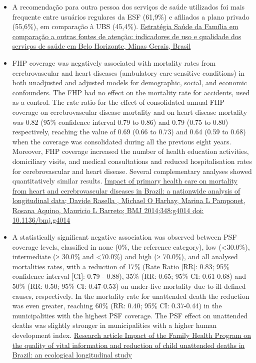 \documentclass[]{book}
\begin{document}
\begin{itemize}
\item
  A recomendação para outra pessoa dos serviços de saúde utilizados foi mais frequente entre usuários regulares da ESF (61,9\%) e afiliados a plano privado (55,6\%), em comparação à UBS (45,4\%). \href{http://www.scielo.br/scielo.php?script=sci_arttext\&pid=S0102-311X2013000700011\&lng=en\&nrm=iso\&tlng=en}{Estratégia Saúde da Família em comparação a outras fontes de atenção: indicadores de uso e qualidade dos serviços de saúde em Belo Horizonte, Minas Gerais, Brasil}
\item
  FHP coverage was negatively associated with mortality rates from cerebrovascular and heart diseases (ambulatory care-sensitive conditions) in both unadjusted and adjusted models for demographic, social, and economic confounders. The FHP had no effect on the mortality rate for accidents, used as a control. The rate ratio for the effect of consolidated annual FHP coverage on cerebrovascular disease mortality and on heart disease mortality was 0.82 (95\% confidence interval 0.79 to 0.86) and 0.79 (0.75 to 0.80) respectively, reaching the value of 0.69 (0.66 to 0.73) and 0.64 (0.59 to 0.68) when the coverage was consolidated during all the previous eight years. Moreover, FHP coverage increased the number of health education activities, domiciliary visits, and medical consultations and reduced hospitalisation rates for cerebrovascular and heart disease. Several complementary analyses showed quantitatively similar results. \href{https://www.bmj.com/content/bmj/349/bmj.g4014.full.pdf}{Impact of primary health care on mortality from heart and cerebrovascular diseases in Brazil: a nationwide analysis of longitudinal data; Davide Rasella , Michael O Harhay, Marina L Pamponet, Rosana Aquino, Mauricio L Barreto; BMJ 2014;348:g4014 doi: 10.1136/bmj.g4014}
\item
  A statistically significant negative association was observed between PSF coverage levels, classified in none (0\%, the reference category), low (\textless{}30.0\%), intermediate (≥ 30.0\% and \textless{}70.0\%) and high (≥ 70.0\%), and all analysed mortalities rates, with a reduction of 17\% (Rate Ratio {[}RR{]}: 0.83; 95\% confidence interval {[}CI{]}: 0.79 - 0.88), 35\% (RR: 0.65; 95\% CI: 0.61-0.68) and 50\% (RR: 0.50; 95\% CI: 0.47-0.53) on under-five mortality due to ill-defined causes, respectively. In the mortality rate for unattended death the reduction was even greater, reaching 60\% (RR: 0.40; 95\% CI: 0.37-0.44) in the municipalities with the highest PSF coverage. The PSF effect on unattended deaths was slightly stronger in municipalities with a higher human development index. \href{https://bmcpublichealth.biomedcentral.com/track/pdf/10.1186/1471-2458-10-380}{Research article Impact of the Family Health Program on the quality of vital information and reduction of child unattended deaths in Brazil: an ecological longitudinal study}

\end{itemize}
\end{document}
